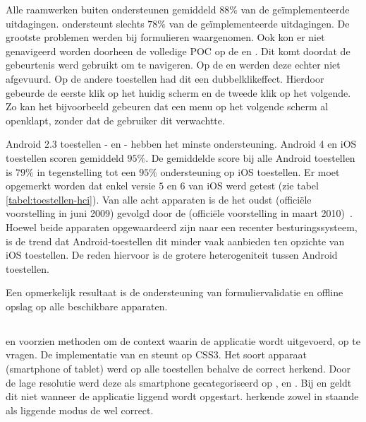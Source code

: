 Alle raamwerken buiten \lungo{} ondersteunen gemiddeld $88\%$ van de geïmplementeerde uitdagingen.
\lungo{} ondersteunt slechts $78\%$ van de geïmplementeerde uitdagingen.
De grootste problemen werden bij formulieren waargenomen.
Ook kon er niet genavigeerd worden doorheen de volledige POC op de \htc{} en \gtab{}. 
Dit komt doordat de  gebeurtenis werd gebruikt om te navigeren.
Op de \htc{} en \gtab{} werden deze echter niet afgevuurd.
Op de andere toestellen had dit een dubbelklikeffect.
Hierdoor gebeurde de eerste klik op het huidig scherm en de tweede klik op het volgende.
Zo kan het bijvoorbeeld gebeuren dat een menu op het volgende scherm al openklapt, zonder dat de gebruiker dit verwachtte.

Android 2.3 toestellen - \htc{} en \gtab{} - hebben het minste ondersteuning.
Android 4 en iOS toestellen scoren gemiddeld $95\%$.
De gemiddelde score bij alle Android toestellen is $79\%$ in tegenstelling tot een $95\%$ ondersteuning op iOS toestellen.
Er moet opgemerkt worden dat enkel versie $5$ en $6$ van iOS werd getest (zie tabel \ref{tabel:toestellen-hci}).
Van alle acht apparaten is de \iphoneiii{} het oudst (officiële voorstelling in juni 2009) gevolgd door de \gs{} (officiële voorstelling in maart 2010)~\cite{Staff2009,Gideon2010}.
Hoewel beide apparaten opgewaardeerd zijn naar een recenter besturingssysteem, is de trend dat Android-toestellen dit minder vaak aanbieden ten opzichte van iOS toestellen.
De reden hiervoor is de grotere heterogeniteit tussen Android toestellen.


Een opmerkelijk resultaat is de ondersteuning van formuliervalidatie en offline opslag op alle beschikbare apparaten.


\subsection{}
\label{sec:evaluatie-ondersteuning-toestel}

\st{} en \kendo{} voorzien methoden om de context waarin de applicatie wordt uitgevoerd,  op te vragen.
De implementatie van \jqm{} en \lungo{} steunt op CSS3.
Het soort apparaat (smartphone of tablet) werd op alle toestellen behalve de \gtab correct herkend.
Door de lage resolutie werd deze als smartphone gecategoriseerd op \st{},  \jqm{} en \lungo{}.
Bij \jqm{} en \lungo{} geldt dit niet wanneer de applicatie liggend wordt opgestart.
\kendo{} herkende zowel in staande als liggende modus de \gtab{} wel correct.


